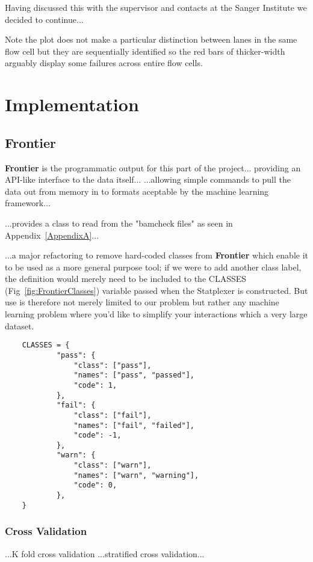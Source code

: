 Having discussed this with the supervisor and contacts at the Sanger Institute
we decided to continue...

Note the plot does not make a particular distinction between lanes in the same
flow cell but they are sequentially identified so the red bars of thicker-width
arguably display some failures across entire flow cells.

\section{Implementation}
\subsection{Frontier}
\textbf{Frontier} is the programmatic output for this part of the project...
providing an API-like interface to the data itself... ...allowing simple
commands to pull the data out from memory in to formats aceptable by the machine
learning framework...

...provides a class to read from the "bamcheck files" as seen in
Appendix~\ref{AppendixA}...

...a major refactoring to remove hard-coded classes from \textbf{Frontier} which
enable it to be used as a more general purpose tool; if we were to add another
class label, the definition would merely need to be included to the CLASSES
(Fig~\ref{fig:FrontierClasses}) variable passed when the Statplexer is
constructed. But use is therefore not merely limited to our problem but rather
any machine learning problem where you'd like to simplify your interactions
which a very large dataset.

\begin{verbatim}
    CLASSES = {
            "pass": {
                "class": ["pass"],
                "names": ["pass", "passed"],
                "code": 1,
            },
            "fail": {
                "class": ["fail"],
                "names": ["fail", "failed"],
                "code": -1,
            },
            "warn": {
                "class": ["warn"],
                "names": ["warn", "warning"],
                "code": 0,
            },
    }
\end{verbatim}

\subsubsection{Cross Validation}
...K fold cross validation
...stratified cross validation...

